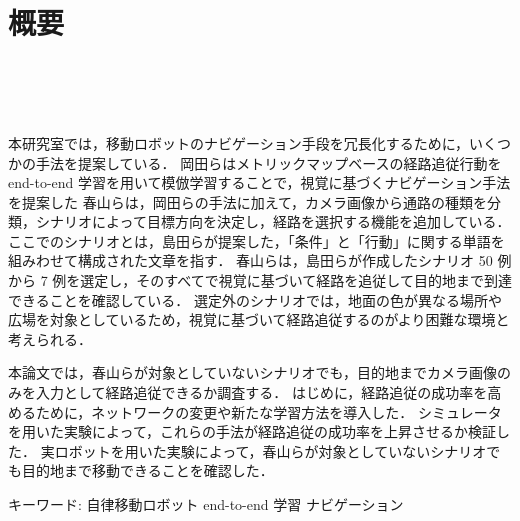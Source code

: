 \chapter*{概要}
\thispagestyle{empty}
%
\begin{center}
  \scalebox{1.0}{視覚と行動のend-to-end学習により}\\
  \vspace{-1.0zh}
  \scalebox{1.0}{経路追従行動を模倣する手法の提案}\\
  \scalebox{1.0}{-経路選択の成功率向上を意図したネットワークの変更と実験的評価-}\\
\end{center}
\vspace{1.0zh}

本研究室では，移動ロボットのナビゲーション手段を冗長化するために，いくつかの手法を提案している．
岡田らはメトリックマップベースの経路追従行動を end-to-end 学習を用いて模倣学習することで，視覚に基づくナビゲーション手法を提案した
春山らは，岡田らの手法に加えて，カメラ画像から通路の種類を分類，シナリオによって目標方向を決定し，経路を選択する機能を追加している．
ここでのシナリオとは，島田らが提案した，「条件」と「行動」に関する単語を組みわせて構成された文章を指す．
春山らは，島田ら\cite{shimada2020}が作成したシナリオ 50 例から 7 例を選定し，そのすべてで視覚に基づいて経路を追従して目的地まで到達できることを確認している．
選定外のシナリオでは，地面の色が異なる場所や広場を対象としているため，視覚に基づいて経路追従するのがより困難な環境と考えられる．

本論文では，春山らが対象としていないシナリオでも，目的地までカメラ画像のみを入力として経路追従できるか調査する．
はじめに，経路追従の成功率を高めるために，ネットワークの変更や新たな学習方法を導入した．
シミュレータを用いた実験によって，これらの手法が経路追従の成功率を上昇させるか検証した．
実ロボットを用いた実験によって，春山らが対象としていないシナリオでも目的地まで移動できることを確認した．

キーワード: 自律移動ロボット end-to-end 学習 ナビゲーション
%
\newpage
